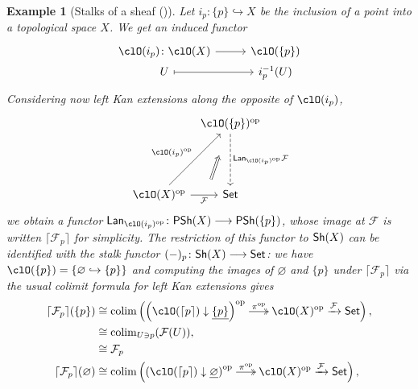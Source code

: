 \documentclass[11pt]{amsart}
\newcommand{\xlongertwoheadrightarrow}[1]{%
    \mathrel{%
        \mkern-15.25mu
        \begin{tikzcd}[row sep=3.6em, column sep=1.8em, ampersand replacement=\&]
            {}
            \arrow[r, "#1", two heads] \&
            {}
        \end{tikzcd}
        \mkern-16.25mu
    }
}
\newcommand{\PSh}[1]{\textsf{\upshape PSh}(#1)}
\newcommand{\Shv}[1]{\textsf{\upshape Sh}(#1)}
\newcommand{\Lan}{\mathsf{Lan}}
\newcommand{\ceiling}[1]{\lceil#1\rceil}
\let\ceil\ceiling
\def\colim{\mathrm{colim}}
\newtheorem{example}{Example}
\def\op{\text{op}}
\begin{document}
\begin{example}[Stalks of a sheaf {(\cite[Paragraph 6.8 and Section 7.1]{sgaiv})}]
	Let $i_{p}\colon\{p\}\hookrightarrow X$ be the inclusion of a point into a topological space $X$. We get an induced functor
	\[
		\begin{tikzcd}[row sep=0.0em, column sep=2.7em,  ampersand replacement=\&]
			\clO(i_{p})\colon \clO(X)
			\arrow[r]
			\&
			\clO(\{p\})
			\\
			U
			\arrow[r, mapsto]
			\&
			i_{p}^{-1}(U)
		\end{tikzcd}
	\]%
	Considering now left Kan extensions along the opposite of $\clO(i_{p})$,
	\[
		\begin{tikzcd}[row sep={6.3em,between origins}, column sep={6.3em,between origins}, ampersand replacement=\&]
			{}
			\&
			\clO(\{p\})^{\op}
			\arrow[d, "\Lan_{\clO(i_{p})^{\op}}\mathcal{F}", dashed]
			\\
			\clO(X)^{\op}
			\arrow[ru, "\clO(i_{p})^{\op}"]
			\arrow[r, "\mathcal{F}"'{name=F}]
			\&
			\textsf{Set}
			\arrow[from=F,to=1-2,shorten=1.75em,Rightarrow,xshift=-0.125em,yshift=-0.25em]
		\end{tikzcd}
	\]
	we obtain a functor $\Lan_{\clO(i_{p})^{\op}}\colon\PSh{X}\longrightarrow\PSh{\{p\}}$, whose image at $\mathcal{F}$ is written $\ceil{\mathcal{F}_{p}}$ for simplicity. The restriction of this functor to $\Shv{X}$ can be identified with the stalk functor $(-)_{p}\colon\Shv{X}\longrightarrow\textsf{Set}$: we have $\clO(\{p\})=\{\varnothing\hookrightarrow\{p\}\}$ and computing the images of $\varnothing$ and $\{p\}$ under $\ceil{\mathcal{F}_{p}}$ via the usual colimit formula for left Kan extensions gives
	\begin{align*}
		\ceil{\mathcal{F}_{p}}(\{p\})       & \cong \colim\left(\left(\clO(\ceil{p})\downarrow\underline{\{p\}}\right)^{\op}\xlongertwoheadrightarrow{\pi^{\op}}\clO(X)^{\op}\xrightarrow{\mathcal{F}}\textsf{Set}\right),       \\
		                                      & \cong \colim_{U\ni p}(\mathcal{F}(U)),                                                                                                                                                   \\
		                                      & \cong \mathcal{F}_{p}                                                                                                                                                                    \\
		\ceil{\mathcal{F}_{p}}(\varnothing) & \cong \colim\left(\left(\clO(\ceil{p})\downarrow\underline{\varnothing}\right)^{\op}\xlongertwoheadrightarrow{\pi^{\op}}\clO(X)^{\op}\xrightarrow{\mathcal{F}}\textsf{Set}\right), \\

\end{align*}
\end{example}
\end{document}
